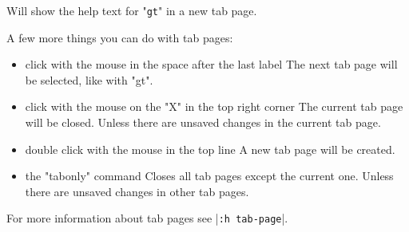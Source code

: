 Will show the help text for "\verb!gt!" in a new tab page.

A few more things you can do with tab pages:
\begin{itemize}
				\item click with the mouse in the space after the last label The next tab page will be selected, like with "gt".
				\item click with the mouse on the "X" in the top right corner The current tab page will be closed.
								Unless there are unsaved changes in the current tab page.
				\item double click with the mouse in the top line A new tab page will be created.
				\item the "tabonly" command Closes all tab pages except the current one.
								Unless there are unsaved changes in other tab pages.
\end{itemize}
For more information about tab pages see |\verb!:h tab-page!|.
\clearpage
